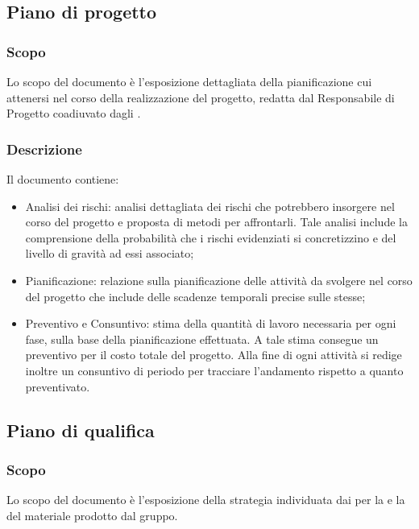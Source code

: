 \documentclass[../NomeDocumento.tex]{subfiles}
\begin{document}

\subsection{Piano di progetto}

\subsubsection{Scopo}
Lo scopo del documento è l'esposizione dettagliata della pianificazione cui attenersi nel corso della realizzazione del progetto, redatta dal Responsabile di Progetto coadiuvato dagli . 

\subsubsection{Descrizione}
Il documento contiene:
\begin{itemize}
    \item{Analisi dei rischi:} analisi dettagliata dei rischi che potrebbero insorgere nel corso del progetto e proposta di metodi per affrontarli. Tale analisi include la comprensione della probabilità che i rischi evidenziati si concretizzino e del livello di gravità ad essi associato;
    
    \item{Pianificazione:} relazione sulla pianificazione delle attività da svolgere nel corso del progetto che include delle scadenze temporali precise sulle stesse;
    
    \item{Preventivo e Consuntivo:} stima della quantità di lavoro necessaria per ogni fase, sulla base della pianificazione effettuata. A tale stima consegue un preventivo per il costo totale del progetto. Alla fine di ogni attività si redige inoltre un consuntivo di periodo per tracciare l’andamento rispetto a quanto preventivato.
\end{itemize}


\subsection{Piano di qualifica}

\subsubsection{Scopo}
Lo scopo del documento è l'esposizione della strategia individuata dai  per la  e la  del materiale prodotto dal gruppo. 
\end{document}
